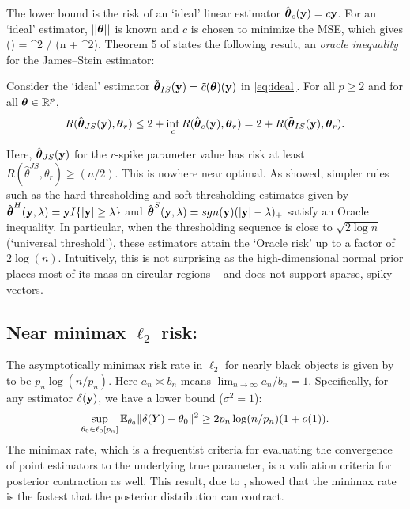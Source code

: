 \documentclass[sts,preprint]{imsart}
\begin{document}
The lower bound is the risk of an `ideal' linear estimator $\hat{\boldsymbol{\theta}}_c({\bf y}) = c{\bf y}$. For an `ideal' estimator, $\left|\left|\boldsymbol{\theta}\right|\right|$ is known and $c$ is chosen to minimize the MSE, which gives 
\beq 
{}(\btheta) = \vectornorm{\btheta}^2 / (n + \vectornorm{\btheta}^2). \label{eq:ideal}
\eeq
Theorem 5 of \cite{donoho1995adapting} states the following result, an \textit{oracle inequality} for the James--Stein estimator: 
\begin{lemma}
Consider the `ideal' estimator $\tilde{\boldsymbol{\theta}}_{IS}({\bf y}) = \tilde{c}(\boldsymbol{\theta})({\bf y})$ in \eqref{eq:ideal}. For all $p \ge 2$ and for all $\boldsymbol{\theta} \in \mathbb{R}^p$, 
\[
R({\hat{\boldsymbol{\theta}}}_{JS}{}({\bf y}), \boldsymbol{\theta}_r) \le 2 + \inf_c R(\hat{\boldsymbol{\theta}}_c({\bf y}), \boldsymbol{\theta}_r) = 2 + R(\tilde{\boldsymbol{\theta}}_{IS}({\bf y}), \boldsymbol{\theta}_r).
\]
\end{lemma}
Here, ${\hat{\boldsymbol{\theta}}}_{JS}{}({\bf y})$ for the $r$-spike parameter value has risk at least $R\left( \hat{\theta}^{JS} , \theta_r \right) \geq (n/2)$. This is nowhere near optimal. As \citet{donoho1994ideal} showed, simpler rules such as the hard-thresholding and soft-thresholding estimates given by
$\hat{\boldsymbol{\theta}}^{H}({\bf y},\lambda) = {\bf y} I\{\lvert{\bf y}\rvert \ge \lambda \}$ and
$\hat{\boldsymbol{\theta}}^{S}({\bf y},\lambda) = sgn({\bf y}) (\lvert{\bf y}\rvert - \lambda)_{+}$ satisfy an Oracle inequality. In particular, when the thresholding sequence is close to
$\sqrt{2\log n}$ (`universal threshold'), these estimators attain the `Oracle risk' up to a factor of $2\log(n)$. Intuitively, this is not
surprising as the high-dimensional normal prior places most of its mass on circular regions -- and does not support sparse, spiky vectors. 

\subsection{Near minimax $\ell_2$ risk:}

The asymptotically minimax risk rate in $\ell_2$ for nearly black objects is given by \citet{donoho1992maximum} to be $p_n \log \left ( n / p_n \right )$. Here $a_n \asymp b_n$ means $\lim_{n\to\infty} a_n/b_n=1$. Specifically, for any estimator $\delta({\bf y})$, we have a lower bound ($\sigma^2  = 1$): 
\begin{equation}
  \sup_{\theta_0 \in \ell_0[p_n]} \mathbb E_{\theta_0} \lVert\delta(Y) - \theta_0\rVert^2
  \ge 2 p_n \log(n/p_n)(1+o(1)). 
\end{equation}
The minimax rate, which is a frequentist criteria for evaluating the convergence of point estimators to the underlying true parameter, is a validation criteria for posterior contraction as well. This result, due to
\citet{ghosal2000}, showed that the minimax rate is the fastest that the posterior distribution can contract. 
\end{document}
